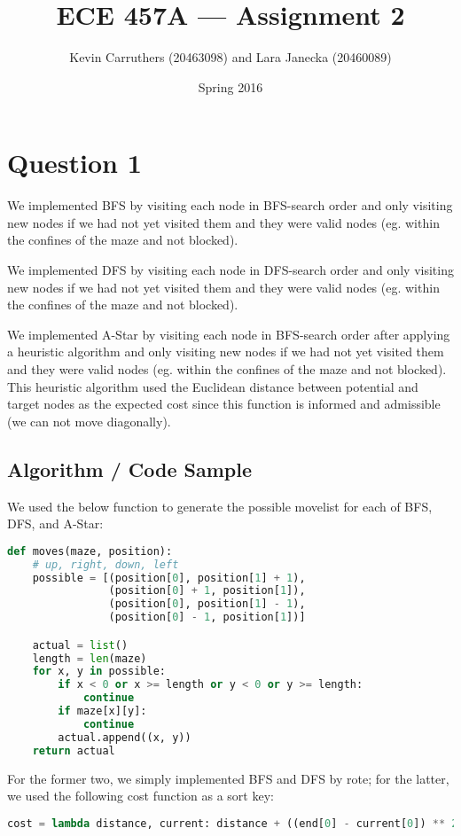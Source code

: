 \documentclass[12pt]{article}
\begin{document}
\title{ECE 457A --- Assignment 2}
\author{Kevin Carruthers (20463098) and Lara Janecka (20460089)}
\date{\vspace{-2ex}Spring 2016}
\maketitle\HRule

\section*{Question 1}
We implemented BFS by visiting each node in BFS-search order and only visiting new nodes if we had not yet visited them and they were valid nodes (eg. within the confines of the maze and not blocked).

We implemented DFS by visiting each node in DFS-search order and only visiting new nodes if we had not yet visited them and they were valid nodes (eg. within the confines of the maze and not blocked).

We implemented A-Star by visiting each node in BFS-search order after applying a heuristic algorithm and only visiting new nodes if we had not yet visited them and they were valid nodes (eg. within the confines of the maze and not blocked). This heuristic algorithm used the Euclidean distance between potential and target nodes as the expected cost since this function is informed and admissible (we can not move diagonally).

\subsection*{Algorithm / Code Sample}
We used the below function to generate the possible movelist for each of BFS, DFS, and A-Star:
\begin{lstlisting}[breaklines=true, language=python]
def moves(maze, position):
    # up, right, down, left
    possible = [(position[0], position[1] + 1),
                (position[0] + 1, position[1]),
                (position[0], position[1] - 1),
                (position[0] - 1, position[1])]

    actual = list()
    length = len(maze)
    for x, y in possible:
        if x < 0 or x >= length or y < 0 or y >= length:
            continue
        if maze[x][y]:
            continue
        actual.append((x, y))
    return actual
\end{lstlisting}

For the former two, we simply implemented BFS and DFS by rote; for the latter, we used the following cost function as a sort key:
\begin{lstlisting}[breaklines=true, language=python]
cost = lambda distance, current: distance + ((end[0] - current[0]) ** 2 + (end[1] - current[1]) ** 2) ** 0.5
\end{lstlisting}
\end{document}
